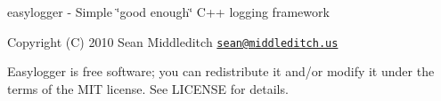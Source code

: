 easylogger -\/ Simple \char`\"{}good enough\char`\"{} C++ logging framework

Copyright (C) 2010 Sean Middleditch \href{mailto:sean@middleditch.us}{\tt sean@middleditch.\+us}

Easylogger is free software; you can redistribute it and/or modify it under the terms of the M\+IT license. See L\+I\+C\+E\+N\+SE for details. 